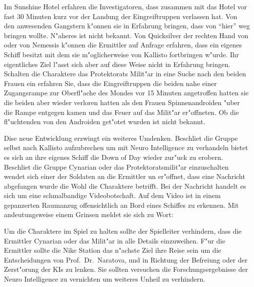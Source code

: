 Im Sunshine Hotel erfahren die Investigatoren, dass \xl{} zusammen mit \ml{} das Hotel vor fast 30 Minuten kurz vor der Landung der Eingreiftruppen verlassen hat. Von den anwesenden Gangstern k"onnen sie in Erfahrung bringen, dass \xl{} \ml{} von "`hier"' weg bringen wollte. N"aheres ist nicht bekannt. Von Quicksilver der rechten Hand von \ml{} oder von Nemessis k"onnen die Ermittler auf Anfrage erfahren, dass \xl{} ein eigenes Schiff besitzt mit dem sie m"oglicherweise \ml{} von Kallisto fortbringen w"urde. Ihr eigentliches Ziel l"asst sich aber auf diese Weise nicht in Erfahrung bringen. Schalten die Charaktere das Protektorats  Milit"ar in eine Suche nach den beiden Frauen ein erfahren Sie, dass die Eingreiftruppen die beiden nahe einer Zugangsrampe zur Oberfl"ache des Mondes vor 15 Minuten angetroffen hatten sie die beiden aber wieder verloren hatten als den Frauen Spinnenandroiden "uber die Rampe entgegen kamen und das Feuer auf das Milit"ar er"offneten. Ob die fl"uchtenden von den Androiden get"otet wurden ist nicht bekannt.

Dise neue Entwicklung erzwingt ein weiteres Umdenken. Beschlie\3t die Gruppe selbst nach Kallisto aufzubrechen um mit Neuro Intelligence zu verhandeln bietet es sich an ihre eigenes Schiff die Down of Day wieder zur"uck zu erobern. Beschlie\3t die Gruppe Cynarian oder das Protektoratsmilit"ar einzuschalten wendet sich einer der Soldaten an die Ermittler un er"offnet, dass eine Nachricht abgefangen wurde die Wohl die Charaktere betrifft. Bei der Nachricht handelt es sich um eine schmalbandige Videobotschaft. Auf dem Video ist \xl{} in einem gepanzerten Raumanzug offensichtlich an Bord eines Schiffes zu erkennen. Mit andeutungsweise einem Grinsen meldet sie sich zu Wort:


\begin{remarks}
	Um die Charaktere im Spiel zu halten sollte der Spielleiter verhindern, dass die Ermittler Cynarian oder das Milit"ar in alle Details einzuweihen. F"ur die Ermittler sollte die Nike Station das n"achste Ziel ihre Reise sein um die Entscheidungen von Prof.~Dr.~Naratova, \ml{} und \xl{} in Richtung der Befreiung oder der Zerst"orung der KIs zu lenken. Sie sollten versuchen die Forschungsergebnisse der Neuro Intelligence zu vernichten um weiteres Unheil zu verhindern.
\end{remarks}

